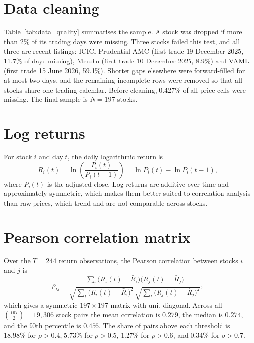 \documentclass[12pt,a4paper]{report}
\begin{document}
\section{Data cleaning}
Table~\ref{tab:data_quality} summarises the sample. A stock was dropped if more than 2\% of its trading days were missing. Three stocks failed this test, and all three are recent listings: ICICI Prudential AMC (first trade 19 December 2025, 11.7\% of days missing), Meesho (first trade 10 December 2025, 8.9\%) and VAML (first trade 15 June 2026, 59.1\%). Shorter gaps elsewhere were forward-filled for at most two days, and the remaining incomplete rows were removed so that all stocks share one trading calendar. Before cleaning, 0.427\% of all price cells were missing. The final sample is $N=197$ stocks.



\section{Log returns}
For stock $i$ and day $t$, the daily logarithmic return is
\begin{equation} 
    R_i(t) = \ln\!\left(\frac{P_i(t)}{P_i(t-1)}\right) = \ln P_i(t) - \ln P_i(t-1),
\end{equation}
where $P_i(t)$ is the adjusted close. Log returns are additive over time and approximately symmetric, which makes them better suited to correlation analysis than raw prices, which trend and are not comparable across stocks.

\section{Pearson correlation matrix}
Over the $T=244$ return observations, the Pearson correlation between stocks $i$ and $j$ is
\begin{equation}
  \rho_{ij} = \frac{\sum_{t}\big(R_i(t)-\bar R_i\big)\big(R_j(t)-\bar R_j\big)}
  {\sqrt{\sum_{t}\big(R_i(t)-\bar R_i\big)^2}\,\sqrt{\sum_{t}\big(R_j(t)-\bar R_j\big)^2}},
\end{equation}
which gives a symmetric $197\times197$ matrix with unit diagonal. Across all $\binom{197}{2}=19{,}306$ stock pairs the mean correlation is $0.279$, the median is $0.274$, and the 90th percentile is $0.456$. The share of pairs above each threshold is $18.98\%$ for $\rho>0.4$, $5.73\%$ for $\rho>0.5$, $1.27\%$ for $\rho>0.6$, and $0.34\%$ for $\rho>0.7$.
\end{document}
